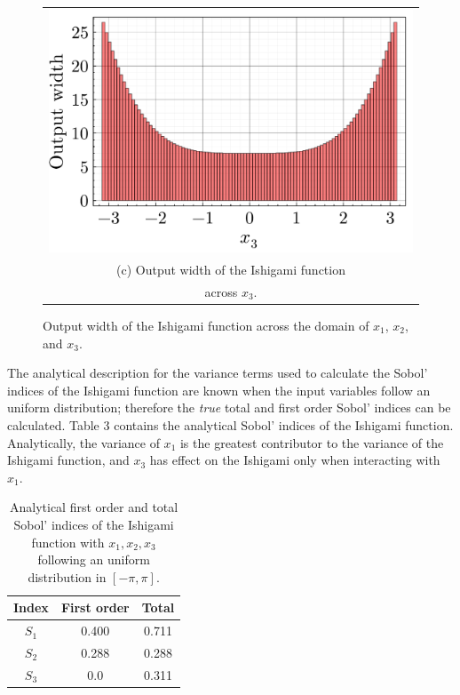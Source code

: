 \documentclass[twocolumn]{rps-esrel2022}
\begin{document}
\begin{figure}[!h]
	\begin{tabular}{@{}c@{}}
		\includegraphics[width=\linewidth]{applications/ishigami_pinching_3.pdf} \\[\abovecaptionskip]
		\small (c) Output width of the Ishigami function\\
		\small across $x_3$.
	  \end{tabular}

	\caption{Output width of the Ishigami function across the domain of $x_1$, $x_2$, and $x_3$.
	}
\end{figure}

The analytical description for the variance terms used to calculate the Sobol' indices of the Ishigami function are known when the input variables
follow an uniform distribution; therefore the \textit{true} total and first order Sobol' indices can be calculated.
Table 3 contains the analytical Sobol' indices of the Ishigami function.
Analytically, the variance of $x_1$ is the greatest contributor to the variance of the Ishigami function, and $x_3$ has effect on the Ishigami
only when interacting with $x_1$.

\begin{table}[!h]
	\centering
	\caption{Analytical first order and total Sobol' indices of the Ishigami function with $x_1,x_2,x_3$ following an uniform distribution in $[-\pi,\pi]$.}
	\begin{tabular}{ccc}
	\hline
	Index & First order & Total\\ \hline
	$S_1$ & 0.400 & 0.711 \\
	$S_2$ & 0.288 & 0.288 \\
	$S_3$ & 0.0 & 0.311 \\ \hline
	\end{tabular}%
\end{table}
\end{document}
